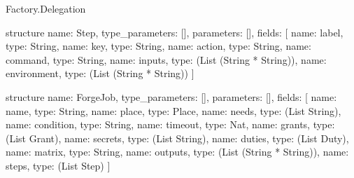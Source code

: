 \begin{lexlean}{Factory.Delegation}
\begin{semanticmodule}
structure{
  name: Step,
  type_parameters: [],
  parameters: [],
  fields: [
    {name: label, type: String},
    {name: key, type: String},
    {name: action, type: String},
    {name: command, type: String},
    {name: inputs, type: (List (String * String))},
    {name: environment, type: (List (String * String))}
  ]
}

structure{
  name: ForgeJob,
  type_parameters: [],
  parameters: [],
  fields: [
    {name: name, type: String},
    {name: place, type: Place},
    {name: needs, type: (List String)},
    {name: condition, type: String},
    {name: timeout, type: Nat},
    {name: grants, type: (List Grant)},
    {name: secrets, type: (List String)},
    {name: duties, type: (List Duty)},
    {name: matrix, type: String},
    {name: outputs, type: (List (String * String))},
    {name: steps, type: (List Step)}
  ]
}


\end{semanticmodule}
\end{lexlean}
